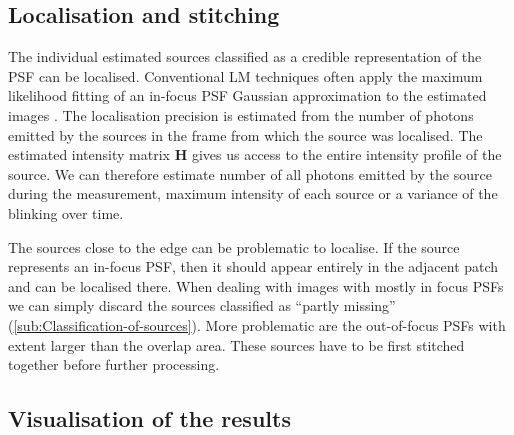 \subsection{Localisation and stitching\label{sub:Localisation-and-stitching}}
The individual estimated sources classified as a credible representation of the PSF can be localised. Conventional LM techniques often apply the maximum likelihood fitting of an in-focus PSF Gaussian approximation to the estimated images \cite{Hess2006}. The localisation precision is estimated from the number of photons emitted by the sources in the frame from which the source was localised. The \inmf{} estimated intensity matrix $\bm{H}$ gives us access to the entire intensity profile of the source. We can therefore estimate number of all photons emitted by the source during the measurement, maximum intensity of each source or a variance of the blinking over time. 

The sources close to the edge can be problematic to localise. If the source represents an in-focus PSF, then it should appear entirely in the adjacent patch and can be localised there. When dealing with images with mostly in focus PSFs we can simply discard the sources classified as ``partly missing'' (\autoref{sub:Classification-of-sources}). More problematic are the out-of-focus PSFs with extent larger than the overlap area. These sources have to be first stitched together before further processing.


\subsection{Visualisation of the results\label{sub:visualisation}}

